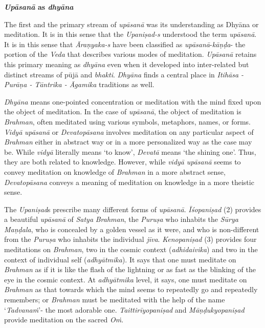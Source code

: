 \textbf{\emph{Upāsanā} as \emph{dhyāna}}

The first and the primary stream of \emph{upāsanā} was its understanding as Dhyāna or meditation. It is in this sense that the \emph{Upaniṣad-s} understood the term \emph{upāsanā}. It is in this sense that \emph{Āraṇyaka-s} have been classified as \emph{upāsanā}-\emph{kāṇḍa}- the portion of the \emph{Veda} that describes various modes of meditation. \emph{Upāsanā} retains this primary meaning as \emph{dhyāna} even when it developed into inter-related but distinct streams of pūjā and \emph{bhakti}. \emph{Dhyāna} finds a central place in \emph{Itihāsa - Purāṇa - Tāntrika - Āgamika} traditions as well.

\emph{Dhyāna} means one-pointed concentration or meditation with the mind fixed upon the object of meditation. In the case of \emph{upāsanā}, the object of meditation is \emph{Brahman}, often meditated using various symbols, metaphors, names, or forms. \emph{Vidyā} \emph{upāsanā} or \emph{Devatopāsana} involves meditation on any particular aspect of \emph{Brahman} either in abstract way or in a more personalized way as the case may be. While \emph{vidyā} literally means `to know', \emph{Devatā} means `the shining one'. Thus, they are both related to knowledge. However, while \emph{vidyā} \emph{upāsanā} seems to convey meditation on knowledge of \emph{Brahman} in a more abstract sense, \emph{Devatopāsana} conveys a meaning of meditation on knowledge in a more theistic sense.

The \emph{Upaniṣad}s prescribe many different forms of \emph{upāsanā}. \emph{Īśopaniṣad} (2) provides a beautiful \emph{upāsanā} of \emph{Satya} \emph{Brahman}, the \emph{Puruṣa} who inhabits the \emph{Sūrya} \emph{Maṇḍala}, who is concealed by a golden vessel as it were, and who is non-different from the \emph{Puruṣa} who inhabits the individual \emph{jīva}. \emph{Kenopaniṣad} (3) provides four meditations on \emph{Brahman}, two in the cosmic context (\emph{adhidaivika}) and two in the context of individual self (\emph{adhyātmika}). It says that one must meditate on \emph{Brahman} as if it is like the flash of the lightning or as fast as the blinking of the eye in the cosmic context. At \emph{adhyātmika} level, it says, one must meditate on \emph{Brahman} as that towards which the mind seems to repeatedly go and repeatedly remembers; or \emph{Brahman} must be meditated with the help of the name `\emph{Tadvanaṁ}'- the most adorable one. \emph{Taittirīyopaniṣad} and \emph{Māṇḍukyopaniṣad} provide meditation on the sacred \emph{Oṁ}.

